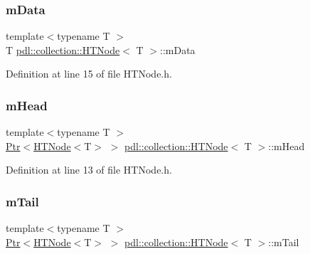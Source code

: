 \subsubsection{\texorpdfstring{mData}{mData}}
{\footnotesize\ttfamily template$<$typename T $>$ \\
T \mbox{\hyperlink{classpdl_1_1collection_1_1_h_t_node}{pdl\+::collection\+::\+H\+T\+Node}}$<$ T $>$\+::m\+Data\hspace{0.3cm}{\ttfamily [private]}}



Definition at line 15 of file H\+T\+Node.\+h.

\mbox{\label{classpdl_1_1collection_1_1_h_t_node_a10f7c41866b1d09722e319c3ca740f00}} 
\subsubsection{\texorpdfstring{mHead}{mHead}}
{\footnotesize\ttfamily template$<$typename T $>$ \\
\mbox{\hyperlink{classpdl_1_1memory_1_1_ptr}{Ptr}}$<$\mbox{\hyperlink{classpdl_1_1collection_1_1_h_t_node}{H\+T\+Node}}$<$T$>$ $>$ \mbox{\hyperlink{classpdl_1_1collection_1_1_h_t_node}{pdl\+::collection\+::\+H\+T\+Node}}$<$ T $>$\+::m\+Head\hspace{0.3cm}{\ttfamily [private]}}



Definition at line 13 of file H\+T\+Node.\+h.

\mbox{\label{classpdl_1_1collection_1_1_h_t_node_acbf167f6ff62c765bd4c6dd329a6c8c3}} 
\subsubsection{\texorpdfstring{mTail}{mTail}}
{\footnotesize\ttfamily template$<$typename T $>$ \\
\mbox{\hyperlink{classpdl_1_1memory_1_1_ptr}{Ptr}}$<$\mbox{\hyperlink{classpdl_1_1collection_1_1_h_t_node}{H\+T\+Node}}$<$T$>$ $>$ \mbox{\hyperlink{classpdl_1_1collection_1_1_h_t_node}{pdl\+::collection\+::\+H\+T\+Node}}$<$ T $>$\+::m\+Tail\hspace{0.3cm}{\ttfamily [private]}}



